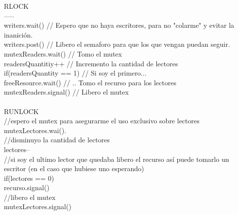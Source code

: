 RLOCK\\
-----\\
	writers.wait()			// Espero que no haya escritores, para no "colarme" y evitar la inanición.\\
	writers.post()			// Libero el semaforo para que los que vengan puedan seguir.\\
	mutexReaders.wait()		// Tomo el mutex\\
	readersQuantitiy++		// Incremento la cantidad de lectores\\
	if(readersQuantity == 1)	// Si soy el primero... \\
		freeResource.wait()	// .. Tomo el recurso para los lectores\\
	mutexReaders.signal()		// Libero el mutex\\
\\
RUNLOCK\\
//espero el mutex para asegurarme el uso exclusivo sobre lectores\\
mutexLectores.wai().\\
//disminuyo la cantidad de lectores\\
lectores--\\
//si soy el ultimo lector que quedaba libero el recurso así puede tomarlo un escritor (en el caso que hubiese uno esperando)\\
if(lectores == 0)\\
	recurso.signal()\\
//libero el mutex\\
mutexLectores.signal()\\
